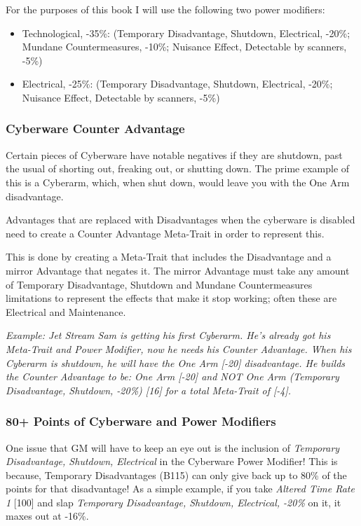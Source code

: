 \begin{multicols*}{3}
	For the purposes of this book I will use the following two power modifiers:
	
	\begin{itemize}
		\item Technological, -35\%: (Temporary Disadvantage, Shutdown, Electrical,  -20\%; Mundane Countermeasures, -10\%; Nuisance Effect, Detectable by scanners, -5\%)
		\item Electrical, -25\%: (Temporary Disadvantage, Shutdown, Electrical, -20\%; Nuisance Effect, Detectable by scanners, -5\%)
	\end{itemize}
	
	\subsubsection{Cyberware Counter Advantage}
	
	Certain pieces of Cyberware have notable negatives if they are shutdown, past the usual of shorting out, freaking out, or shutting down. The prime example of this is a Cyberarm, which, when shut down, would leave you with the One Arm disadvantage. 
	
	Advantages that are replaced with Disadvantages when the cyberware is disabled need to create a Counter Advantage Meta-Trait in order to represent this.
	
	This is done by creating a Meta-Trait that includes the Disadvantage and a mirror Advantage that negates it. The mirror Advantage must take any amount of Temporary Disadvantage, Shutdown and Mundane Countermeasures limitations to represent the effects that make it stop working; often these are Electrical and Maintenance.
	
	\textit{\textcolor{OliveGreen}{Example: Jet Stream Sam is getting his first Cyberarm. He's already got his Meta-Trait and Power Modifier, now he needs his Counter Advantage. When his Cyberarm is shutdown, he will have the One Arm [-20] disadvantage. He builds the Counter Advantage to be: One Arm [-20] and NOT One Arm (Temporary Disadvantage, Shutdown, -20\%) [16] for a total Meta-Trait of [-4].}}
	
	\subsubsection{80+ Points of Cyberware and Power Modifiers}
	
	One issue that GM will have to keep an eye out is the inclusion of \textit{Temporary Disadvantage, Shutdown, Electrical} in the Cyberware Power Modifier! This is because, Temporary Disadvantages (B115) can only give back up to 80\% of the points for that disadvantage! As a simple example, if you take \textit{Altered Time Rate 1} [100] and slap \textit{Temporary Disadvantage, Shutdown, Electrical, -20\%} on it, it maxes out at -16\%.
	

\end{multicols*}
